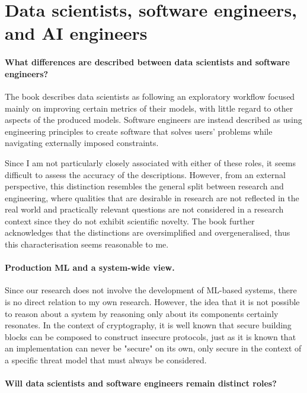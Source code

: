 \documentclass{article}
\begin{document}
\section{Data scientists, software engineers, and AI engineers}

\paragraph{What differences are described between data scientists and software engineers?}

The book describes data scientists as following an exploratory workflow focused mainly on improving certain metrics of their models, with little regard to other aspects of the produced models. Software engineers are instead described as using engineering principles to create software that solves users' problems while navigating externally imposed constraints.

Since I am not particularly closely associated with either of these roles, it seems difficult to assess the accuracy of the descriptions. However, from an external perspective, this distinction resembles the general split between research and engineering, where qualities that are desirable in research are not reflected in the real world and practically relevant questions are not considered in a research context since they do not exhibit scientific novelty. The book further acknowledges that the distinctions are oversimplified and overgeneralised, thus this characterisation seems reasonable to me.

\paragraph{Production ML and a system-wide view.}

Since our research does not involve the development of ML-based systems, there is no direct relation to my own research. However, the idea that it is not possible to reason about a system by reasoning only about its components certainly resonates. In the context of cryptography, it is well known that secure building blocks can be composed to construct insecure protocols, just as it is known that an implementation can never be "secure" on its own, only secure in the context of a specific threat model that must always be considered.

\paragraph{Will data scientists and software engineers remain distinct roles?}
\end{document}
